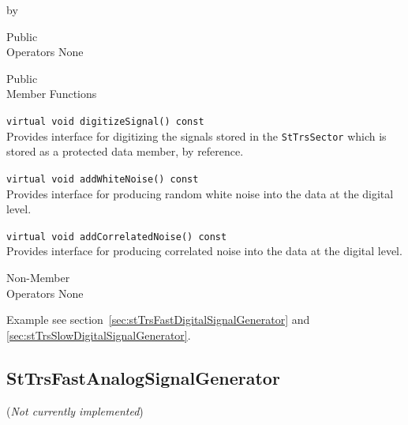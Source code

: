 \documentclass[twoside]{article}
\newcommand{\comp}[1]{\texttt{#1}}%
\newcommand{\entrylabel}[1]{\mbox{\textbf{{#1}}}\hfil}%
\newenvironment{entry}
{\begin{list}{}%
    {\renewcommand{\makelabel}{\entrylabel}%
     \setlength{\labelwidth}{90pt}%
     \setlength{\leftmargin}{\labelwidth}
     \advance\leftmargin by \labelsep%
      }%
    }%
  {\end{list}}
\newcommand{\Entrylabel}[1]%
{\raisebox{0pt}[1ex][0pt]{\makebox[\labelwidth][l]%
    {\parbox[t]{\labelwidth}{\hspace{0pt}\textbf{{#1}}}}}}
\newenvironment{Entry}%
{\renewcommand{\entrylabel}{\Entrylabel}\begin{entry}}%
  {\end{entry}}
\begin{document}
\begin{Entry}
\item[Public \\ Operators]
   None

\item[Public \\ Member Functions]

  \verb+virtual void digitizeSignal() const+\\
  Provides interface for digitizing the signals stored in the 
  \comp{StTrsSector} which is stored as a protected data member,
  by reference.

  \verb+virtual void addWhiteNoise() const+\\
  Provides interface for producing random white noise into the data
  at the digital level.

  \verb+virtual void addCorrelatedNoise() const+\\
  Provides interface for producing correlated noise into the data
  at the digital level.

\item[Non-Member \\ Operators]
  None

\item[Example]
  see section~\ref{sec:stTrsFastDigitalSignalGenerator} and 
  \ref{sec:stTrsSlowDigitalSignalGenerator}.

\end{Entry}
\clearpage

%
%
\subsection{StTrsFastAnalogSignalGenerator} ({\em Not currently implemented})
\label{sec:stTrsFastAnalogSignalGenerator}
\end{document}
